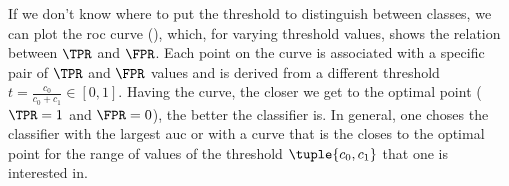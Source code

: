 If we don't know where to put the threshold to distinguish between classes, we can plot the \acf{roc} curve (), which, for varying threshold values, shows the relation between $\TPR$ and $\FPR$. Each point on the curve is associated with a specific pair of $\TPR$ and $\FPR$ values and is derived from a different threshold $t = \frac{c_0}{c_0 + c_1}\in [0,1]$. Having the curve, the closer we get to the optimal point ($\TPR = 1$ and $\FPR = 0$), the better the classifier is. In general, one choses the classifier with the largest \acf{auc} or with a curve that is the closes to the optimal point for the range of values of the threshold $\tuple{c_0, c_1}$ that one is interested in.